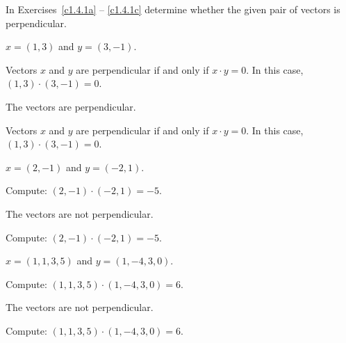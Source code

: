 \documentclass{ximera}
\begin{document}
\noindent In Exercises~\ref{c1.4.1a} -- \ref{c1.4.1c} determine
whether the given pair of vectors is perpendicular.
\begin{exercise} \label{c1.4.1a}
  $x=(1,3)$ and $y=(3,-1)$.
  \begin{multipleChoice}
  \end{multipleChoice}
  \begin{hint}
    Vectors $x$ and $y$ are perpendicular if and only if
    $x \cdot y = 0$.  In this case, $(1,3) \cdot (3,-1) = 0$.
  \end{hint}

\begin{solution}
\ans The vectors are perpendicular.

\soln Vectors $x$ and $y$ are perpendicular if and only if $x \cdot y = 0$.
In this case, $(1,3) \cdot (3,-1) = 0$.

\end{solution}
\end{exercise}
\begin{exercise} \label{c1.4.1b}
  $x=(2,-1)$ and $y=(-2,1)$.
  \begin{multipleChoice}
  \end{multipleChoice}
  \begin{hint}
    Compute: $(2,-1) \cdot (-2,1) = -5$.
  \end{hint}

\begin{solution}
\ans The vectors are not perpendicular.

\soln Compute: $(2,-1) \cdot (-2,1) = -5$.

\end{solution}
\end{exercise}
\begin{exercise} \label{c1.4.1bb}
  $x=(1,1,3,5)$ and $y=(1,-4,3,0)$.
    \begin{multipleChoice}
  \end{multipleChoice}
  \begin{hint}
     Compute: $(1,1,3,5) \cdot (1,-4,3,0) = 6$.
  \end{hint}

\begin{solution}
\ans The vectors are not perpendicular.

\soln Compute: $(1,1,3,5) \cdot (1,-4,3,0) = 6$.

\end{solution}
\end{exercise}
\end{document}
